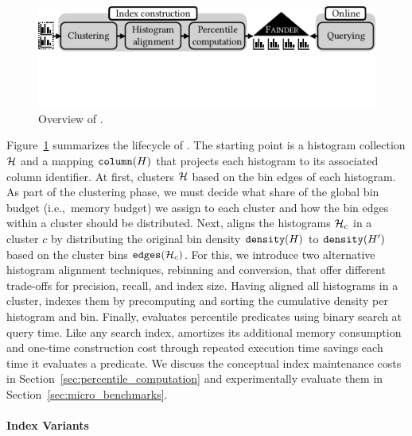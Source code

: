 \begin{figure}[t]
    \centering
    \includegraphics[trim=0 1.4cm 0 0]{figures/diagrams/fainder.pdf}
    \caption{Overview of \system{}.}
    \label{fig:fainder_overview}
\end{figure}

Figure~\ref{fig:fainder_overview} summarizes the lifecycle of \system{}.
The starting point is a histogram collection $\mathcal{H}$ and a mapping $\FuncSty{column}(H)$ that projects each histogram to its associated column identifier.
At first, \system{} clusters $\mathcal{H}$ based on the bin edges of each histogram.
As part of the clustering phase, we must decide what share of the global bin budget (i.e.,~memory budget) we assign to each cluster and how the bin edges within a cluster should be distributed.
Next, \system{} aligns the histograms $\mathcal{H}_c$ in a cluster $c$ by distributing the original bin density $\density{H}$ to $\density{H'}$ based on the cluster bins $\edges{\cH_c}$.
For this, we introduce two alternative histogram alignment techniques, rebinning and conversion, that offer different trade-offs for precision, recall, and index size.
Having aligned all histograms in a cluster, \system{} indexes them by precomputing and sorting the cumulative density per histogram and bin.
Finally, \system{} evaluates percentile predicates using binary search at query time.
Like any search index, \system{} amortizes its additional memory consumption and one-time construction cost through repeated execution time savings each time it evaluates a predicate.
We discuss the conceptual index maintenance costs in Section~\ref{sec:percentile_computation} and experimentally evaluate them in Section~\ref{sec:micro_benchmarks}.

\paragraph{Index Variants}

